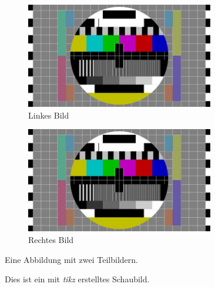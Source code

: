 \begin{figure}[!htbp]
	\centering
	\begin{subfigure}[c]{.5\linewidth}
		\centering
		\includegraphics[width=0.9\textwidth]{Bilder/Testbild}
		\caption{Linkes Bild}
		\label{fig:TestDoppelLinks}
	\end{subfigure}%
	\begin{subfigure}[c]{.5\linewidth}
		\centering
		\includegraphics[width=0.9\textwidth]{Bilder/Testbild}
		\caption{Rechtes Bild}
		\label{fig:TestDoppelRechts}
	\end{subfigure}
	\caption{Eine Abbildung mit zwei Teilbildern.}
	\label{fig:TestDoppel}
\end{figure}

\begin{figure}[!htbp]
	\centering
	\caption{Dies ist ein mit \textit{tikz} erstelltes Schaubild.}
	\label{fig:TestTikz}
\end{figure}

